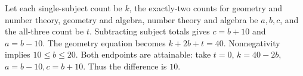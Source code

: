 Let each single-subject count be $k$, the exactly-two counts for geometry and number theory, geometry and algebra, number theory and algebra be $a,b,c$, and the all-three count be $t$. Subtracting subject totals gives $c=b+10$ and $a=b-10$. The geometry equation becomes $k+2b+t=40$. Nonnegativity implies $10\le b\le20$. Both endpoints are attainable: take $t=0$, $k=40-2b$, $a=b-10,c=b+10$. Thus the difference is $\boxed{10}$.
